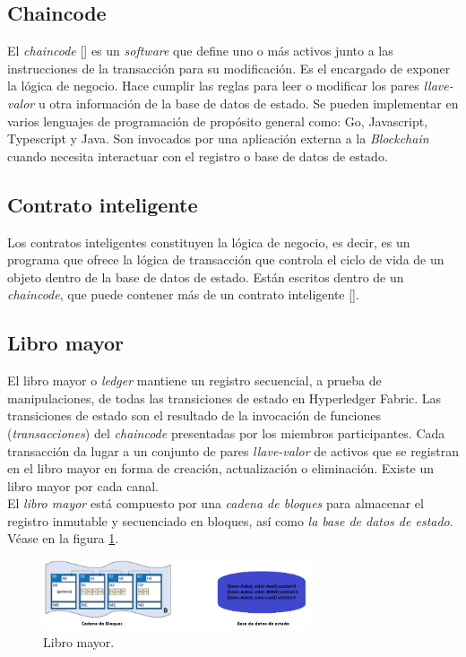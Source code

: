 \subsection{Chaincode}
El \emph{chaincode} [\cite{Chaincode}] es un \emph{software} que define uno o m\'as activos junto a las instrucciones de la transacci\'on para su modificaci\'on. Es el encargado de exponer la l\'ogica de negocio. Hace cumplir las reglas para leer o modificar los pares \emph{llave-valor} u otra informaci\'on de la base de datos de estado. Se pueden implementar en varios lenguajes de programaci\'on de prop\'osito general como: Go, Javascript, Typescript y Java. Son invocados por una aplicaci\'on externa a la \emph{Blockchain} cuando necesita interactuar con el registro o base de datos de estado.

\subsection{Contrato inteligente}
Los contratos inteligentes constituyen la l\'ogica de negocio, es decir, es un programa que ofrece la l\'ogica de transacci\'on que controla el ciclo de vida de un objeto dentro de la base de datos de estado. Est\'an escritos dentro de un \emph{chaincode}, que puede contener m\'as de un contrato inteligente [\cite{SmartContract}].

\subsection{Libro mayor}
El libro mayor o \emph{ledger} mantiene un registro secuencial, a prueba de manipulaciones, de todas las transiciones de estado en Hyperledger Fabric. Las transiciones de estado son el resultado de la invocaci\'on de funciones (\emph{transacciones}) del \emph{chaincode} presentadas por los miembros participantes. Cada transacci\'on da lugar a un conjunto de pares \emph{llave-valor} de activos que se registran en el libro mayor en forma de creaci\'on, actualizaci\'on o eliminaci\'on. Existe un libro mayor por cada canal.\\

El \emph{libro mayor} est\'a compuesto por una \emph{cadena de bloques} para almacenar el registro inmutable y secuenciado en bloques, as\'i como \emph{la base de datos de estado}. V\'ease en la figura \ref{Libro mayor}.\\

\begin{figure}[h]
\centering
\includegraphics[width=0.7\textwidth]{Graphics/Ledger.png}
\caption{Libro mayor.}
\label{Libro mayor}
\end{figure}

